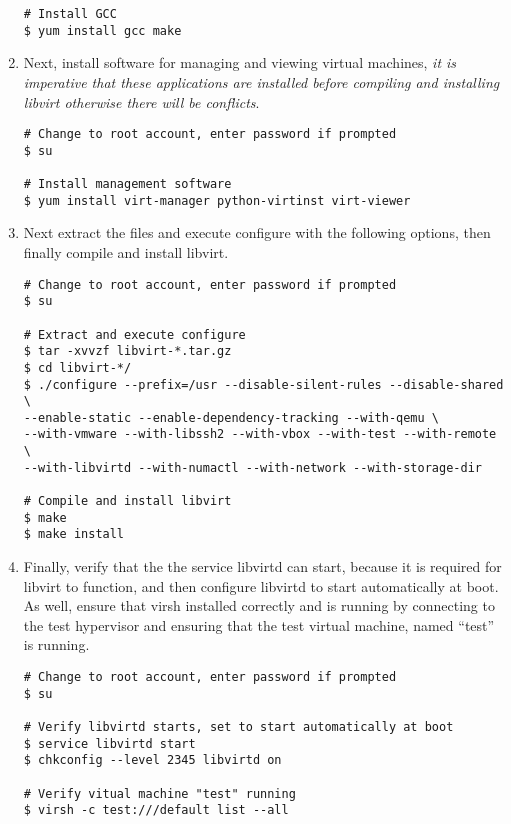 \begin{enumerate}
\begin{lstlisting}
# Install GCC
$ yum install gcc make
\end{lstlisting}

\item	Next, install software for managing and viewing virtual machines, \emph{it is imperative that these applications are
			installed before compiling and installing libvirt otherwise there will be conflicts}.

\lstset{language=bash,caption=Install Virtual Machine Management Software}
\begin{lstlisting}
# Change to root account, enter password if prompted
$ su

# Install management software
$ yum install virt-manager python-virtinst virt-viewer
\end{lstlisting}
	
\item	Next extract the files and execute configure with the following options, then finally compile and install libvirt.

\lstset{language=bash,caption=Compile and Install libvirt}
\begin{lstlisting}
# Change to root account, enter password if prompted
$ su

# Extract and execute configure
$ tar -xvvzf libvirt-*.tar.gz
$ cd libvirt-*/
$ ./configure --prefix=/usr --disable-silent-rules --disable-shared \
--enable-static --enable-dependency-tracking --with-qemu \
--with-vmware --with-libssh2 --with-vbox --with-test --with-remote \
--with-libvirtd --with-numactl --with-network --with-storage-dir

# Compile and install libvirt
$ make 
$ make install	
\end{lstlisting}
	
\item 	Finally, verify that the the service libvirtd can start, because it is required for libvirt to function,  and then
			configure libvirtd to start automatically at boot. As well, ensure that virsh installed correctly and is running by 
			connecting to the test hypervisor and ensuring that the test virtual machine, named ``test'' is running.

\lstset{language=bash,caption=Verify virsh was Installed Properly}
\begin{lstlisting}
# Change to root account, enter password if prompted
$ su

# Verify libvirtd starts, set to start automatically at boot
$ service libvirtd start
$ chkconfig --level 2345 libvirtd on

# Verify vitual machine "test" running
$ virsh -c test:///default list --all
\end{lstlisting}
\end{enumerate}




